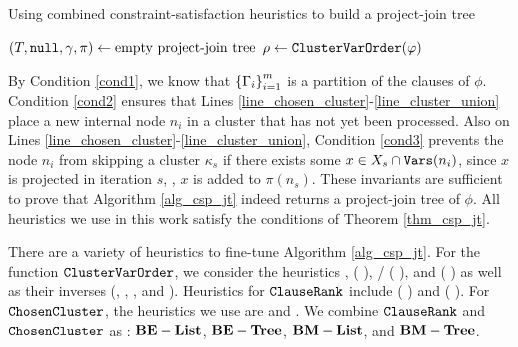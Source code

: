 \begin{algorithm*}[t]
\label{alg_csp_jt}
\caption{Using combined constraint-satisfaction heuristics to build a project-join tree}
    \DontPrintSemicolon
    $(T, \texttt{\upshape null}, \gamma, \pi) \gets \text{empty project-join tree}$\;
    $\rho \gets \texttt{\upshape ClusterVarOrder}(\varphi)$
\end{algorithm*}

By Condition \ref{cond1}, we know that $\left\{ \Gamma_i \right\}_{i = 1}^m$ is a partition of the clauses of $\phi$.
Condition \ref{cond2} ensures that Lines \ref{line_chosen_cluster}-\ref{line_cluster_union} place a new internal node $n_i$ in a cluster that has not yet been processed.
Also on Lines \ref{line_chosen_cluster}-\ref{line_cluster_union}, Condition \ref{cond3} prevents the node $n_i$ from skipping a cluster $\kappa_s$ if there exists some $x \in X_s \cap \texttt{\upshape Vars}(n_i)$, since $x$ is projected in iteration $s$, \ie, $x$ is added to $\pi(n_s)$.
These invariants are sufficient to prove that Algorithm \ref{alg_csp_jt} indeed returns a project-join tree of $\phi$.
All heuristics we use in this work satisfy the conditions of Theorem \ref{thm_csp_jt}.

There are a variety of heuristics to fine-tune Algorithm \ref{alg_csp_jt}.
For the function $\texttt{\upshape ClusterVarOrder}$, we consider the heuristics \Random, \Mcs{} ( \cite{tarjan1984simple}), \Lexp/\Lexm{} ( \cite{koster2001treewidth}), and \Minfill{} ( \cite{dechter03}) as well as their inverses (\Invmcs, \Invlexp, \Invlexm, and \Invminfill).
Heuristics for $\texttt{\upshape ClauseRank}$ include \Be{} ( \cite{dechter99}) and \Bm{} ( \cite{bouquet1999gestion}).
For $\texttt{\upshape ChosenCluster}$, the heuristics we use are \ListH{} and \TreeH{} \cite{DPV20}.
We combine $\texttt{\upshape ClauseRank}$ and $\texttt{\upshape ChosenCluster}$ as : $\textbf{BE}-\textbf{List}$, $\textbf{BE}-\textbf{Tree}$, $\textbf{BM}-\textbf{List}$, and $\textbf{BM}-\textbf{Tree}$.

